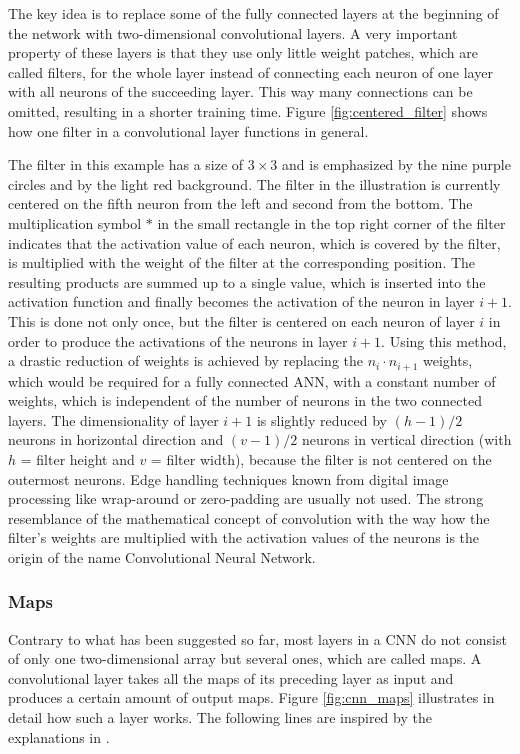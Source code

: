 \documentclass[11pt, a4paper]{article}
\begin{document}
The key idea is to replace some of the fully connected layers at the beginning of the network with two-dimensional convolutional layers. A very important property of these layers is that they use only little weight patches, which are called filters, for the whole layer instead of connecting each neuron of one layer with all neurons of the succeeding layer. This way many connections can be omitted, resulting in a shorter training time. Figure \ref{fig:centered_filter} shows how one filter in a convolutional layer functions in general.

The filter in this example has a size of $3\times 3$ and is emphasized by the nine purple circles and by the light red background. The filter in the illustration is currently centered on the fifth neuron from the left and second from the bottom. The multiplication symbol $*$ in the small rectangle in the top right corner of the filter indicates that the activation value of each neuron, which is covered by the filter, is multiplied with the weight of the filter at the corresponding position. The resulting products are summed up to a single value, which is inserted into the activation function and finally becomes the activation of the neuron in layer $i+1$. This is done not only once, but the filter is centered on each neuron of layer $i$ in order to produce the activations of the neurons in layer $i+1$. Using this method, a drastic reduction of weights is achieved by replacing the $n_i \cdot n_{i+1}$ weights, which would be required for a fully connected \ac{ANN}, with a constant number of weights, which is independent of the number of neurons in the two connected layers. The dimensionality of layer $i+1$ is slightly reduced by $(h - 1) / 2$ neurons in horizontal direction and $(v - 1)/2$ neurons in vertical direction (with $h$ = filter height and $v$ = filter width), because the filter is not centered on the outermost neurons. Edge handling techniques known from digital image processing like wrap-around or zero-padding are usually not used. The strong resemblance of the mathematical concept of convolution with the way how the filter's weights are multiplied with the activation values of the neurons is the origin of the name Convolutional Neural Network.

\subsubsection{Maps}
\label{subsubsec:maps}

Contrary to what has been suggested so far, most layers in a \ac{CNN} do not consist of only one two-dimensional array but several ones, which are called maps. A convolutional layer takes all the maps of its preceding layer as input and produces a certain amount of output maps. Figure \ref{fig:cnn_maps} illustrates in detail how such a layer works. The following lines are inspired by the explanations in \cite{gtsrb}.

\end{document}
